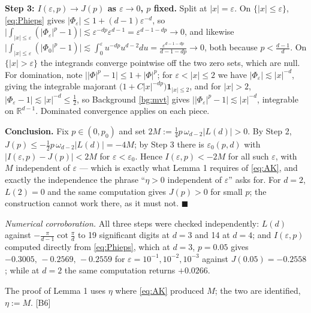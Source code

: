 \documentclass[11pt,reqno]{amsart}
\theoremstyle{plain}
\theoremstyle{definition}
\theoremstyle{plain}
\theoremstyle{definition}
\theoremstyle{remark}
\newcommand{\Rdm}{\mathbb{R}^{d-1}}
\newcommand{\Ledger}[1]{{\scriptsize\textsf{[#1]}}}
\begin{document}
\begin{filled}
\medskip
\noindent\textbf{Step 3: $I(\varepsilon,p)\to J(p)$ as $\varepsilon\to0$, $p$ fixed.}
Split at $|x|=\varepsilon$. On $\{|x|\le\varepsilon\}$, \eqref{eq:Phieps} gives
$|\Phi_\varepsilon|\le1+(d-1)\varepsilon^{-d}$, so
$\bigl|\int_{|x|\le\varepsilon}(|\Phi_\varepsilon|^p-1)\bigr|
 \lesssim\varepsilon^{-dp}\varepsilon^{d-1}=\varepsilon^{d-1-dp}\to0$, and likewise
$\bigl|\int_{|x|\le\varepsilon}(|\Phi_0|^p-1)\bigr|
 \lesssim\int_0^\varepsilon u^{-dp}u^{d-2}du
 =\frac{\varepsilon^{d-1-dp}}{d-1-dp}\to0$, both because $p<\frac{d-1}{d}$.
On $\{|x|>\varepsilon\}$ the integrands converge pointwise off the two zero sets, which
are null. For domination, note $\bigl||\Phi|^p-1\bigr|\le1+|\Phi|^p$; for
$\varepsilon<|x|\le2$ we have $|\Phi_\varepsilon|\lesssim|x|^{-d}$, giving the
integrable majorant $\bigl(1+C|x|^{-dp}\bigr)\mathbf 1_{|x|\le2}$, and for $|x|>2$,
$|\Phi_\varepsilon-1|\lesssim|x|^{-d}\le\frac12$, so Background \ref{bg:mvt} gives
$\bigl||\Phi_\varepsilon|^p-1\bigr|\lesssim|x|^{-d}$, integrable on $\Rdm$. Dominated
convergence applies on each piece.

\medskip
\noindent\textbf{Conclusion.} Fix $p\in(0,p_0)$ and set
$2M:=\tfrac14 p\,\omega_{d-2}|L(d)|>0$. By Step 2,
$J(p)\le-\tfrac12p\,\omega_{d-2}|L(d)|=-4M$; by Step 3 there is $\varepsilon_0(p,d)$
with $|I(\varepsilon,p)-J(p)|<2M$ for $\varepsilon<\varepsilon_0$. Hence
$I(\varepsilon,p)<-2M$ for all such $\varepsilon$, with $M$ independent of
$\varepsilon$ --- which is exactly what Lemma 1 requires of \eqref{eq:AK}, and exactly
the independence the phrase ``$\eta>0$ independent of $\varepsilon$'' asks for.
For $d=2$, $L(2)=0$ and the same computation gives $J(p)>0$ for small $p$; the
construction cannot work there, as it must not. \hfill$\blacksquare$

\medskip
\noindent\emph{Numerical corroboration.} All three steps were checked independently:
$L(d)$ against $-\frac{\pi}{d-1}\cot\frac\pi d$ to 19 significant digits at $d=3$ and
14 at $d=4$; and $I(\varepsilon,p)$ computed directly from \eqref{eq:Phieps}, which at
$d=3$, $p=0.05$ gives $-0.3005,\,-0.2569,\,-0.2559$ for
$\varepsilon=10^{-1},10^{-2},10^{-3}$ against $J(0.05)=-0.2558$; while at $d=2$ the
same computation returns $+0.0266$.
\end{filled}

\begin{ournotation}
The proof of Lemma 1 uses $\eta$ where \eqref{eq:AK} produced $M$; the two are
identified, $\eta:=M$. \Ledger{B6}
\end{ournotation}
\end{document}
